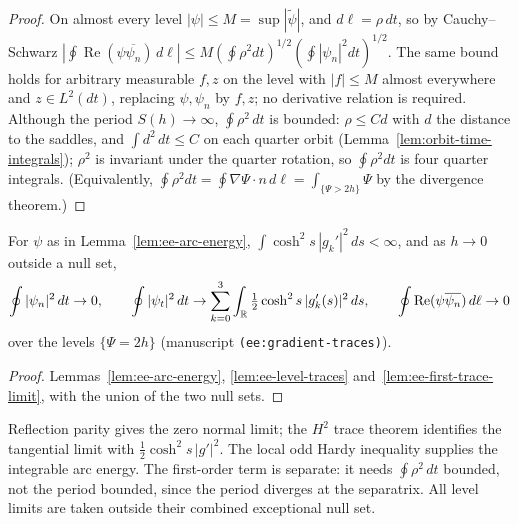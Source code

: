 \begin{proof}
\leanok
On almost every level $|\psi|\le M=\sup|\tilde\psi|$, and $d\ell=\rho\,dt$, so by
Cauchy--Schwarz $|\oint\operatorname{Re}(\psi\overline{\psi_n})\,d\ell|\le
M(\oint\rho^2dt)^{1/2}(\oint|\psi_n|^2dt)^{1/2}$.
The same bound holds for arbitrary measurable $f,z$ on the level with
$|f|\le M$ almost everywhere and $z\in L^2(dt)$, replacing
$\psi,\psi_n$ by $f,z$; no derivative relation is required.
Although the period $S(h)\to\infty$,
$\oint\rho^2\,dt$ is bounded: $\rho\le Cd$ with $d$ the distance to the saddles, and
$\int d^2\,dt\le C$ on each quarter orbit (Lemma~\ref{lem:orbit-time-integrals}); $\rho^2$ is
invariant under the quarter rotation, so $\oint\rho^2dt$ is four quarter integrals.
(Equivalently, $\oint\rho^2dt=\oint\nabla\Psi\cdot n\,d\ell=\int_{\{\Psi>2h\}}\Psi$ by the divergence
theorem.)
\end{proof}

\begin{lemma}
\label{lem:ee-gradient-traces}
\leanok
For $\psi$ as in Lemma~\ref{lem:ee-arc-energy}, $\int\cosh^2s\,|g_k'|^2\,ds<\infty$, and as
$h\to0$ outside a null set,
\[
  \oint|\psi_n|^2\,dt\to0,\qquad
  \oint|\psi_t|^2\,dt\to\sum_{k=0}^{3}\int_{\mathbb{R}}\tfrac12\cosh^2s\,|g_k'(s)|^2\,ds,\qquad
  \oint\operatorname{Re}(\psi\overline{\psi_n})\,d\ell\to0
\]
over the levels $\{\Psi=2h\}$ (manuscript \texttt{(ee:gradient-traces)}).
\end{lemma}

\begin{proof}
\leanok
Lemmas~\ref{lem:ee-arc-energy}, \ref{lem:ee-level-traces} and~\ref{lem:ee-first-trace-limit},
with the union of the two null sets.
\end{proof}

\begin{remark}
Reflection parity gives the zero normal limit; the $H^2$ trace theorem
identifies the tangential limit with $\frac12\cosh^2s\,|g'|^2$.
The local odd Hardy inequality supplies the integrable arc energy.
The first-order term is separate: it needs $\oint\rho^2\,dt$ bounded,
not the period bounded, since the period diverges at the separatrix.
All level limits are taken outside their combined exceptional null set.
\end{remark}

